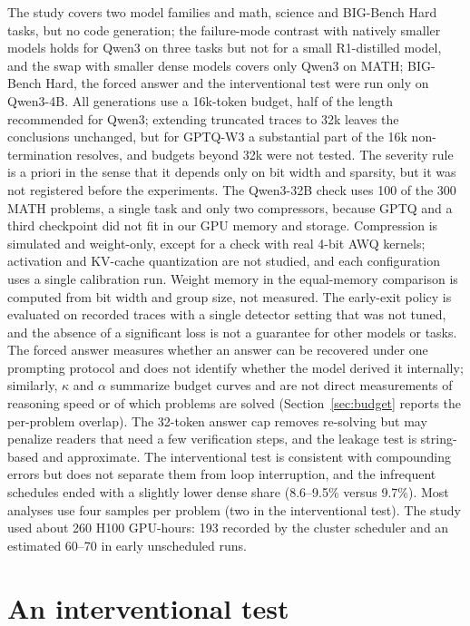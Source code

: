 \documentclass[10pt]{article}
\begin{document}
The study covers two model families and math, science and BIG-Bench Hard tasks, but no code generation; the failure-mode contrast with natively smaller models holds for Qwen3 on three tasks but not for a small R1-distilled model, and the swap with smaller dense models covers only Qwen3 on MATH; BIG-Bench Hard, the forced answer and the interventional test were run only on Qwen3-4B. All generations use a 16k-token budget, half of the length recommended for Qwen3; extending truncated traces to 32k leaves the conclusions unchanged, but for GPTQ-W3 a substantial part of the 16k non-termination resolves, and budgets beyond 32k were not tested. The severity rule is a priori in the sense that it depends only on bit width and sparsity, but it was not registered before the experiments. The Qwen3-32B check uses 100 of the 300 MATH problems, a single task and only two compressors, because GPTQ and a third checkpoint did not fit in our GPU memory and storage. Compression is simulated and weight-only, except for a check with real 4-bit AWQ kernels; activation and KV-cache quantization are not studied, and each configuration uses a single calibration run. Weight memory in the equal-memory comparison is computed from bit width and group size, not measured. The early-exit policy is evaluated on recorded traces with a single detector setting that was not tuned, and the absence of a significant loss is not a guarantee for other models or tasks. The forced answer measures whether an answer can be recovered under one prompting protocol and does not identify whether the model derived it internally; similarly, $\kappa$ and $\alpha$ summarize budget curves and are not direct measurements of reasoning speed or of which problems are solved (Section~\ref{sec:budget} reports the per-problem overlap). The 32-token answer cap removes re-solving but may penalize readers that need a few verification steps, and the leakage test is string-based and approximate. The interventional test is consistent with compounding errors but does not separate them from loop interruption, and the infrequent schedules ended with a slightly lower dense share (8.6--9.5\% versus 9.7\%). Most analyses use four samples per problem (two in the interventional test). The study used about 260 H100 GPU-hours: 193 recorded by the cluster scheduler and an estimated 60--70 in early unscheduled runs.




\appendix

\section{An interventional test}
\label{sec:ablation}
\end{document}
